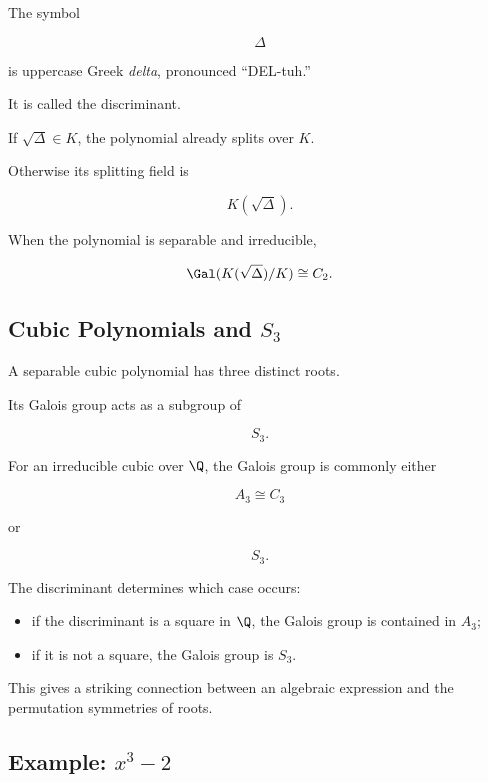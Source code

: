 The symbol

\[ \Delta \]

is uppercase Greek \emph{delta}, pronounced ``DEL-tuh.''

It is called the discriminant.

If \(\sqrt\Delta\in K\), the polynomial already splits over \(K\).

Otherwise its splitting field is

\[ K(\sqrt\Delta). \]

When the polynomial is separable and irreducible,

\[ \Gal(K(\sqrt\Delta)/K)\cong C_2. \]

\subsection{Cubic Polynomials and \(S_3\)}
\label{subsec:galois-cubic-s3}

A separable cubic polynomial has three distinct roots.

Its Galois group acts as a subgroup of

\[ S_3. \]

For an irreducible cubic over \(\Q\), the Galois group is commonly either

\[ A_3\cong C_3 \]

or

\[ S_3. \]

The discriminant determines which case occurs:

\begin{itemize}
    \item if the discriminant is a square in \(\Q\), the Galois group is
    contained in \(A_3\);
    \item if it is not a square, the Galois group is \(S_3\).
\end{itemize}

This gives a striking connection between an algebraic expression and the
permutation symmetries of roots.

\subsection{Example: \(x^3-2\)}
\label{subsec:galois-x3-minus2}

